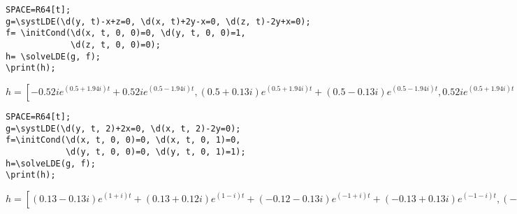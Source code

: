 \begin{verbatim}
SPACE=R64[t];
g=\systLDE(\d(y, t)-x+z=0, \d(x, t)+2y-x=0, \d(z, t)-2y+x=0);
f= \initCond(\d(x, t, 0, 0)=0, \d(y, t, 0, 0)=1, 
             \d(z, t, 0, 0)=0);
h= \solveLDE(g, f);  
\print(h);
\end{verbatim}

{$h = [-0.52ie^{(0.5+1.94i)t}+0.52ie^{(0.5-1.94i)t},
(0.5+0.13i)e^{(0.5+1.94i)t}+(0.5-0.13i)e^{(0.5-1.94i)t},
0.52ie^{(0.5+1.94i)t}-0.52ie^{(0.5-1.94i)t}];$}

\begin{verbatim}
SPACE=R64[t];
g=\systLDE(\d(y, t, 2)+2x=0, \d(x, t, 2)-2y=0);
f=\initCond(\d(x, t, 0, 0)=0, \d(x, t, 0, 1)=0, 
            \d(y, t, 0, 0)=0, \d(y, t, 0, 1)=1);
h=\solveLDE(g, f); 
\print(h);
\end{verbatim}

{$h = [(0.13-0.13i)e^{(1+i)t}+(0.13+0.12i)e^{(1-i)t}+(-0.12-0.13i)e^{(-1+i)t}+(-0.13+0.13i)e^{(-1-i)t},
(-0.13-0.13i)e^{(1+i)t}+(-0.13+0.13i)e^{(1-i)t}+(0.13-0.13i)e^{(-1+i)t}+(0.13+0.13i)e^{(-1-i)t}];$}

